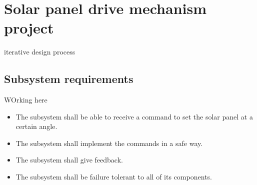 \section{Solar panel drive mechanism project}

iterative design process



\subsection{Subsystem requirements}


WOrking here

\begin{itemize}
    \item The subsystem shall be able to receive a command to set the solar panel at a certain angle.
    \item The subsystem shall implement the commands in a safe way.
    \item The subsystem shall give feedback. 
    \item The subsystem shall be failure tolerant to all of its components.
\end{itemize}